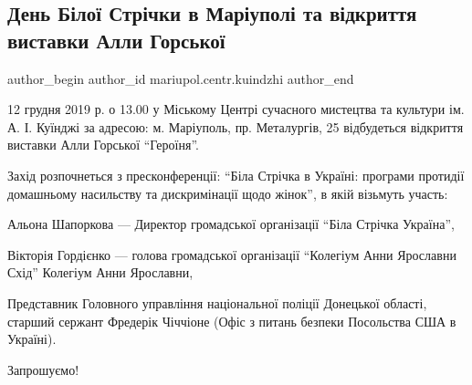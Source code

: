  
 
 
 
 

\subsection{День Білої Стрічки в Маріуполі та відкриття виставки Алли Горської}
\label{sec:10_12_2019.fb.mariupol.centr.kuindzhi.1.den_biloj_strichky_vystavka_alla_gorska}

\ifcmt
 author_begin
   author_id mariupol.centr.kuindzhi
 author_end
\fi

12 грудня 2019 р. о 13.00 у Міському Центрі сучасного мистецтва та культури ім.
А. І. Куїнджі за адресою: м. Маріуполь, пр. Металургів, 25 відбудеться
відкриття виставки Алли Горської \enquote{Героїня}.

Захід розпочнеться з пресконференції: \enquote{Біла Стрічка в Україні: програми
протидії домашньому насильству та дискримінації щодо жінок}, в якій візьмуть
участь: 

Альона Шапоркова — Директор громадської організації \enquote{Біла Стрічка Україна},

Вікторія Гордієнко — голова громадської організації \enquote{Колегіум Анни Ярославни
Схід} Колегіум Анни Ярославни, 

Представник Головного управління національної
поліції Донецької області, старший сержант Фредерік Чіччіоне (Офіс з питань
безпеки Посольства США в Україні).

Запрошуємо!

